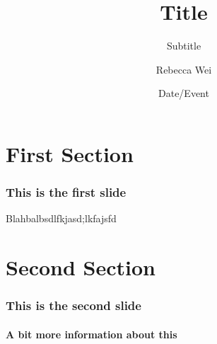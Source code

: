 \documentclass{beamer}
\title{Title}
\subtitle{Subtitle}
\author{Rebecca Wei}
\institute{Northwestern University}
\date{Date/Event}
\begin{document}
\frame{\titlepage}
\frame{\tableofcontents}

\section{First Section}
	\begin{frame}
		\frametitle{This is the first slide}
		\begin{theorem}
		Blahbalbsdlfkjasd;lkfajsfd
		\end{theorem}
	\end{frame}

\section{Second Section}
	\begin{frame}
		\frametitle{This is the second slide}
		\framesubtitle{A bit more information about this}
	\end{frame}
\end{document}
